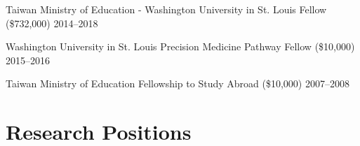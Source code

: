 \documentclass[letterpaper,11pt]{cv}
\begin{document}
\begin{entrylist}

\item Taiwan Ministry of Education - Washington University in St. Louis Fellow (\$732,000) \hfill
    2014--2018 \\
\item Washington University in St. Louis Precision Medicine Pathway Fellow (\$10,000) \hfill
    2015--2016 \\
\item Taiwan Ministry of Education Fellowship to Study Abroad (\$10,000) \hfill
    2007--2008 \\

\end{entrylist}

\section{Research Positions}
\end{document}
